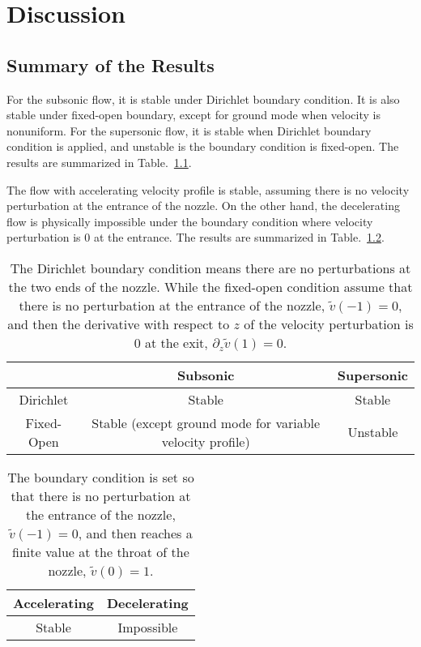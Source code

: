\chapter{Discussion} \label{chap:discussion}
\section{Summary of the Results}
For the subsonic flow, it is stable under Dirichlet boundary condition. It is also stable under fixed-open boundary, except for ground mode when velocity is nonuniform. For the supersonic flow, it is stable when Dirichlet boundary condition is applied, and unstable is the boundary condition is fixed-open. The results are summarized in Table.~\ref{table:results-subsonic-supersonic}.

The flow with accelerating velocity profile is stable, assuming there is no velocity perturbation at the entrance of the nozzle. On the other hand, the decelerating flow is physically impossible under the boundary condition where velocity perturbation is 0 at the entrance. The results are summarized in Table.~\ref{table:results-accelerating-decelerating}.

\begin{table} [htbp]
	\centering
	\caption{The Dirichlet boundary condition means there are no perturbations at the two ends of the nozzle. While the fixed-open condition assume that there is no perturbation at the entrance of the nozzle, $\tilde{v}(-1)=0$, and then the derivative with respect to $z$ of the velocity perturbation is 0 at the exit, $\partial_z\tilde{v}(1)=0$.}
	\begin{tabular}{| c | c | c |}
		\hline
		           & Subsonic                                                  & Supersonic \\
		\hline
		Dirichlet  & Stable                                                    & Stable     \\
		\hline
		Fixed-Open & Stable (except ground mode for variable velocity profile) & Unstable   \\
		\hline
	\end{tabular}
	\label{table:results-subsonic-supersonic}
\end{table}

\begin{table} [htbp]
	\centering
	\caption{The boundary condition is set so that there is no perturbation at the entrance of the nozzle, $\tilde{v}(-1)=0$, and then reaches a finite value at the throat of the nozzle, $\tilde{v}(0)=1$.}
	\begin{tabular}{|c | c|}
		\hline
		Accelerating & Decelerating \\
		\hline
		Stable       & Impossible   \\
		\hline
	\end{tabular}
	\label{table:results-accelerating-decelerating}
\end{table}


